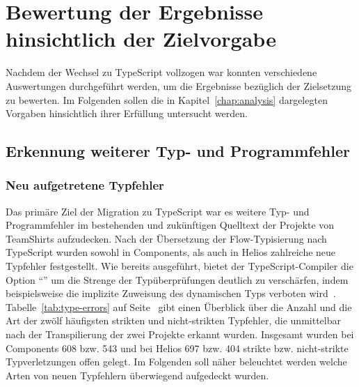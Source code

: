 
\section{Bewertung der Ergebnisse hinsichtlich der Zielvorgabe}

Nachdem der Wechsel zu TypeScript vollzogen war konnten verschiedene Auswertungen durchgeführt werden, um die Ergebnisse bezüglich der Zielsetzung zu bewerten. Im Folgenden sollen die in Kapitel~\ref{chap:analysis} dargelegten Vorgaben hinsichtlich ihrer Erfüllung untersucht werden.

\subsection{Erkennung weiterer Typ- und Programmfehler}
\label{goal:new-type-errors}

\subsubsection{Neu aufgetretene Typfehler}

Das primäre Ziel der Migration zu TypeScript war es weitere Typ- und Programmfehler im bestehenden und zukünftigen Quelltext der Projekte von TeamShirts aufzudecken. Nach der Übersetzung der Flow-Typisierung nach TypeScript wurden sowohl in Components, als auch in Helios zahlreiche neue Typfehler festgestellt. Wie bereits ausgeführt, bietet der TypeScript-Compiler die Option \enquote{} um die Strenge der Typüberprüfungen deutlich zu verschärfen, indem beispielsweise die implizite Zuweisung des dynamischen Typs  verboten wird~\autocite{TSC:OPTIONS}. Tabelle~\ref{tab:type-errors} auf Seite~\pageref{tab:type-errors} gibt einen Überblick über die Anzahl und die Art der zwölf häufigsten strikten und nicht-strikten Typfehler, die unmittelbar nach der Transpilierung der zwei Projekte erkannt wurden. Insgesamt wurden bei Components 608 bzw. 543 und bei Helios 697 bzw. 404 strikte bzw. nicht-strikte Typverletzungen offen gelegt. Im Folgenden soll näher beleuchtet werden welche Arten von neuen Typfehlern überwiegend aufgedeckt wurden.

\medbreak


